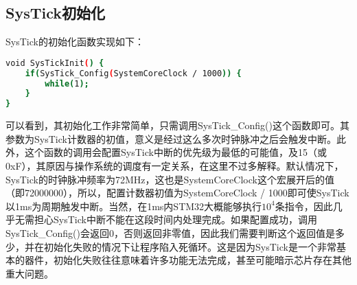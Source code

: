 	\subsection{SysTick初始化}
	SysTick的初始化函数实现如下：
	\par 
	\begin{lstlisting}[language=bash, style=customStyleC, caption=SysTick.h]
void SysTickInit() {
	if(SysTick_Config(SystemCoreClock / 1000)) {
		while(1);
	}
}
	\end{lstlisting}
	\par 
	可以看到，其初始化工作非常简单，只需调用SysTick\_Config()这个函数即可。其参数为SysTick计数器的初值，意义是经过这么多次时钟脉冲之后会触发中断。此外，这个函数的调用会配置SysTick中断的优先级为最低的可能值，及15（或0xF），其原因与操作系统的调度有一定关系，在这里不过多解释。默认情况下，SysTick的时钟脉冲频率为72MHz，这也是SystemCoreClock这个宏展开后的值（即72000000），所以，配置计数器初值为SystemCoreClock / 1000即可使SysTick以1ms为周期触发中断。当然，在1ms内STM32大概能够执行$10^4$条指令，因此几乎无需担心SysTick中断不能在这段时间内处理完成。如果配置成功，调用SysTick\_Config()会返回0，否则返回非零值，因此我们需要判断这个返回值是多少，并在初始化失败的情况下让程序陷入死循环。这是因为SysTick是一个非常基本的器件，初始化失败往往意味着许多功能无法完成，甚至可能暗示芯片存在其他重大问题。













